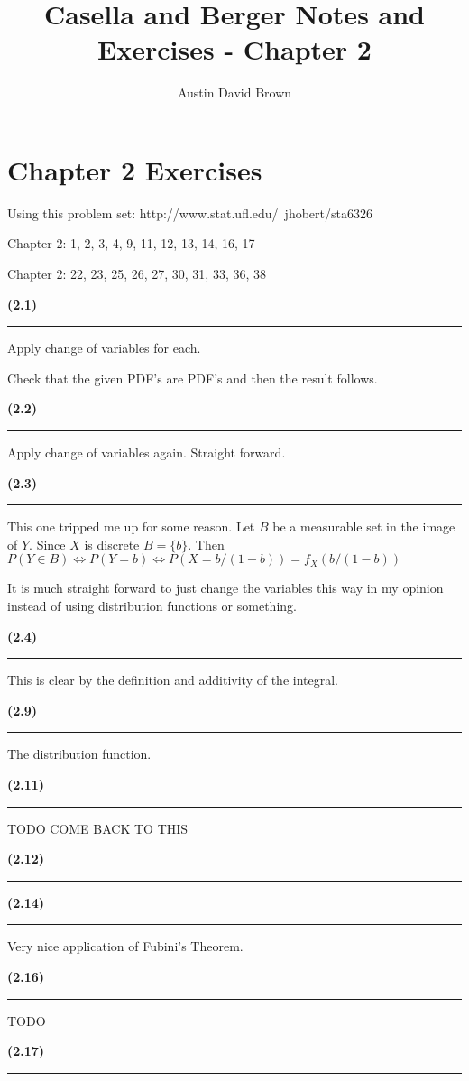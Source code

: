 \documentclass[12pt, reqno]{amsart}
\numberwithin{equation}{section}
\begin{document}
\title{Casella and Berger Notes and Exercises -  Chapter 2}
\author{Austin David Brown}
\maketitle

\section*{Chapter 2 Exercises}

Using this problem set:
http://www.stat.ufl.edu/~jhobert/sta6326

Chapter 2: 1, 2, 3, 4, 9, 11, 12, 13, 14, 16, 17

Chapter 2: 22, 23, 25, 26, 27, 30, 31, 33, 36, 38

{\bf (2.1)\rule{\textwidth}{.5pt}}

Apply change of variables for each.

Check that the given PDF's are PDF's and then the result follows.

{\bf (2.2)\rule{\textwidth}{.5pt}}

Apply change of variables again. Straight forward.

{\bf (2.3)\rule{\textwidth}{.5pt}}

This one tripped me up for some reason.
Let $B$ be a measurable set in the image of $Y$.
Since $X$ is discrete $B = \{b\}$.
Then $P(Y \in B) \iff P(Y = b) \iff P(X = b / (1 - b)) = f_X(b/(1 - b))$

It is much straight forward to just change the variables this way in my opinion instead of using distribution functions or something.

{\bf (2.4)\rule{\textwidth}{.5pt}}

This is clear by the definition and additivity of the integral.

{\bf (2.9)\rule{\textwidth}{.5pt}}

The distribution function.

{\bf (2.11)\rule{\textwidth}{.5pt}}

TODO COME BACK TO THIS

{\bf (2.12)\rule{\textwidth}{.5pt}}

{\bf (2.14)\rule{\textwidth}{.5pt}}

Very nice application of Fubini's Theorem.

{\bf (2.16)\rule{\textwidth}{.5pt}}

TODO

{\bf (2.17)\rule{\textwidth}{.5pt}}
\end{document}
